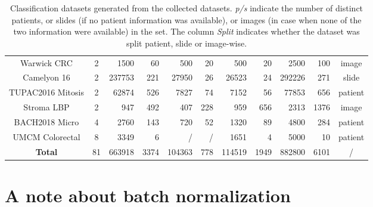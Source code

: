 \begin{table}[t]
\begin{tabular}{|c|c|r:r|r:r|r:r|r:r|c|}
Warwick CRC & 2 & 1500 & 60 & 500 & 20 & 500 & 20 & 2500 & 100 & image \\
Camelyon 16 & 2 & 237753 & 221 & 27950 & 26 & 26523 & 24 & 292226 & 271 & slide\\
TUPAC2016 Mitosis & 2 & 62874 & 526 & 7827 & 74 & 7152 & 56 & 77853 & 656 & patient \\
Stroma LBP & 2 & 947 & 492 & 407 & 228 & 959 & 656 & 2313 & 1376 & image \\
BACH2018 Micro & 4 & 2760 & 143 & 720 & 52 & 1320 & 89 & 4800 & 284 & patient \\
UMCM Colorectal & 8 & 3349 & 6 & / & / & 1651 & 4 & 5000 & 10 & patient \\
\hline
\textbf{Total} & 81 & 663918 & 3374 & 104363 & 778 & 114519 & 1949 & 882800 & 6101 & / \\
\hline
    \end{tabular}
    
    \caption{Classification datasets generated from the collected datasets. \textit{p/s} indicate the number of distinct patients, or slides (if no patient information was available), or images (in case when none of the two information were available) in the set. The column \textit{Split} indicates whether the dataset was split patient, slide or image-wise.}
    \label{app:mtask:tab:final_datasets}
\end{table}

\section{A note about batch normalization}
\label{app:mtask:sec:batch_norm}

